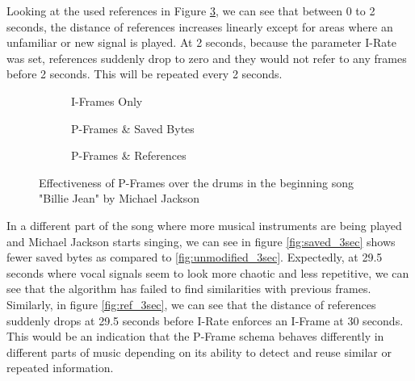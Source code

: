 Looking at the used references in Figure \ref{fig:ref_25sec}, we can see that between 0 to 2 seconds, the distance of references increases linearly except for areas where an unfamiliar or new signal is played. At 2 seconds, because the parameter I-Rate was set, references suddenly drop to zero and they would not refer to any frames before 2 seconds. This will be repeated every 2 seconds.

\begin{figure}[ht]
\centering
\begin{subfigure}{0.30\textwidth}
    
    \caption{I-Frames Only}
    \label{fig:unmodified_25sec}
\end{subfigure}
\hfill
\begin{subfigure}{0.32\textwidth}
    
    \caption{P-Frames \& Saved Bytes}
    \label{fig:saved_25sec}
\end{subfigure}
\hfill
\begin{subfigure}{0.32\textwidth}
    
    \caption{P-Frames \& References}
    \label{fig:ref_25sec}
\end{subfigure}
\caption{Effectiveness of P-Frames over the drums in the beginning song "Billie Jean" by Michael Jackson}
\label{fig:billie_jean_25sec}
\end{figure}

In a different part of the song where more musical instruments are being played and Michael Jackson starts singing, we can see in figure \ref{fig:saved_3sec} shows fewer saved bytes as compared to \ref{fig:unmodified_3sec}. Expectedly, at 29.5 seconds where vocal signals seem to look more chaotic and less repetitive, we can see that the algorithm has failed to find similarities with previous frames. Similarly, in figure \ref{fig:ref_3sec}, we can see that the distance of references suddenly drops at 29.5 seconds before I-Rate enforces an I-Frame at 30 seconds. This would be an indication that the P-Frame schema behaves differently in different parts of music depending on its ability to detect and reuse similar or repeated information.

